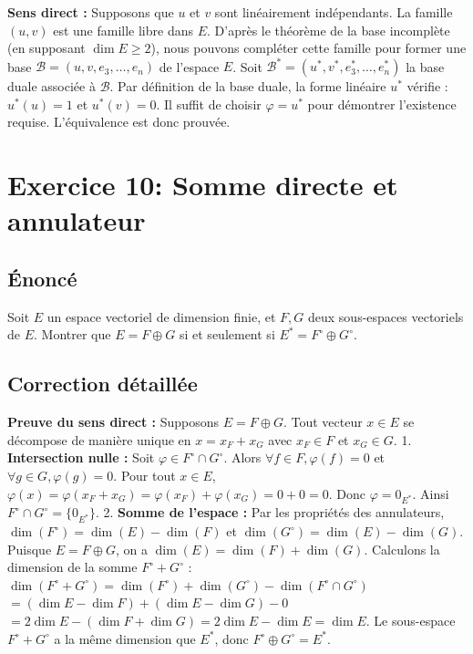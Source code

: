\documentclass{report}
\begin{document}
\textbf{Sens direct :}
Supposons que $u$ et $v$ sont linéairement indépendants.
La famille $(u, v)$ est une famille libre dans $E$.
D'après le théorème de la base incomplète (en supposant $\dim E \ge 2$), nous pouvons compléter cette famille pour former une base $\mathcal{B} = (u, v, e_3, \dots, e_n)$ de l'espace $E$.
Soit $\mathcal{B}^* = (u^*, v^*, e_3^*, \dots, e_n^*)$ la base duale associée à $\mathcal{B}$.
Par définition de la base duale, la forme linéaire $u^*$ vérifie :
$u^*(u) = 1$ et $u^*(v) = 0$.
Il suffit de choisir $\varphi = u^*$ pour démontrer l'existence requise. L'équivalence est donc prouvée.


\newpage
\chapter*{Exercice 10: Somme directe et annulateur}
\section*{Énoncé}
Soit $E$ un espace vectoriel de dimension finie, et $F, G$ deux sous-espaces vectoriels de $E$.
Montrer que $E = F \oplus G$ si et seulement si $E^* = F^\circ \oplus G^\circ$.


\section*{Correction détaillée}
\textbf{Preuve du sens direct :}
Supposons $E = F \oplus G$. Tout vecteur $x \in E$ se décompose de manière unique en $x = x_F + x_G$ avec $x_F \in F$ et $x_G \in G$.
1. \textbf{Intersection nulle :} Soit $\varphi \in F^\circ \cap G^\circ$.
   Alors $\forall f \in F, \varphi(f) = 0$ et $\forall g \in G, \varphi(g) = 0$.
   Pour tout $x \in E$, $\varphi(x) = \varphi(x_F + x_G) = \varphi(x_F) + \varphi(x_G) = 0 + 0 = 0$.
   Donc $\varphi = 0_{E^*}$. Ainsi $F^\circ \cap G^\circ = \{0_{E^*}\}$.
2. \textbf{Somme de l'espace :} Par les propriétés des annulateurs, $\dim(F^\circ) = \dim(E) - \dim(F)$ et $\dim(G^\circ) = \dim(E) - \dim(G)$.
   Puisque $E = F \oplus G$, on a $\dim(E) = \dim(F) + \dim(G)$.
   Calculons la dimension de la somme $F^\circ + G^\circ$ :
   $\dim(F^\circ + G^\circ) = \dim(F^\circ) + \dim(G^\circ) - \dim(F^\circ \cap G^\circ)$
   $= (\dim E - \dim F) + (\dim E - \dim G) - 0$
   $= 2\dim E - (\dim F + \dim G) = 2\dim E - \dim E = \dim E$.
   Le sous-espace $F^\circ + G^\circ$ a la même dimension que $E^*$, donc $F^\circ \oplus G^\circ = E^*$.
\end{document}
